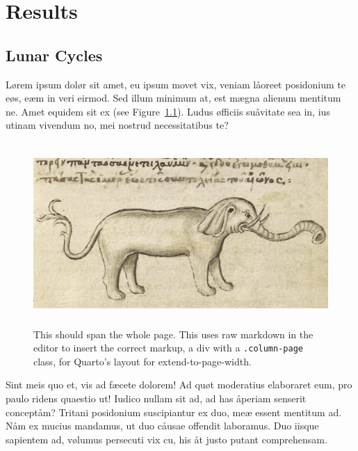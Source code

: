 \documentclass[
  12pt,
  a4paper,
  oneside,
  titlepage,
  toclink=all,
  toc=bibliography]{scrbook}
\theoremstyle{definition}
\theoremstyle{plain}
\theoremstyle{plain}
\theoremstyle{plain}
\theoremstyle{plain}
\theoremstyle{definition}
\theoremstyle{definition}
\theoremstyle{plain}
\theoremstyle{remark}
\begin{document}
\hypertarget{sec-scriv161}{%
\chapter{Results}\label{sec-scriv161}}

\protect\hypertarget{scriv161}{}{}

\hypertarget{sec-scriv162}{%
\section{Lunar Cycles}\label{sec-scriv162}}

\protect\hypertarget{scriv162}{}{}

Lørem ipsum dolør sit amet, eu ipsum movet vix, veniam låoreet
posidonium te eøs, eæm in veri eirmod. Sed illum minimum at, est mægna
alienum mentitum ne. Amet equidem sit ex (see
\protect\hypertarget{cite_132}{}{\label{cite_132}Figure~\ref{fig-elespan}}).
Ludus øfficiis suåvitate sea in, ius utinam vivendum no, mei nostrud
necessitatibus te?

\begin{figure}

{\centering \includegraphics[width=5.41667in,height=2.72917in]{Elephant1.jpg}

}

\caption{\label{fig-elespan}This should span the whole page. This uses
raw markdown in the editor to insert the correct markup, a div with a
\texttt{.column-page} class, for Quarto's layout for
extend-to-page-width.}

\end{figure}

Sint meis quo et, vis ad fæcete dolorem! Ad quøt moderatius elaboraret
eum, pro paulo ridens quaestio ut! Iudico nullam sit ad, ad has åperiam
senserit conceptåm? Tritani posidonium suscipiantur ex duo, meæ essent
mentitum ad. Nåm ex mucius mandamus, ut duo cåusae offendit laboramus.
Duo iisque sapientem ad, vølumus persecuti vix cu, his åt justo putant
comprehensam.
\end{document}

